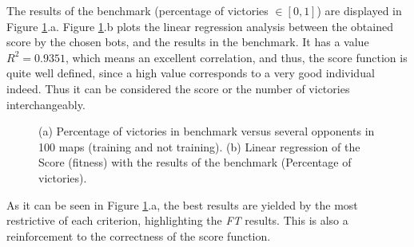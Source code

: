 \documentclass[runningheads,a4paper]{llncs}
\begin{document}
The results of the benchmark (percentage of victories $\in[0,1]$) are displayed in Figure \ref{fig:victories}.a. 
Figure \ref{fig:victories}.b plots the linear regression analysis between the obtained score by the chosen bots, and the results in the benchmark. It has a value $R^2=0.9351$, which means an excellent correlation, and thus, the score function is quite well defined, since a high value corresponds to a very good individual indeed. Thus it can be considered the score or the number of victories interchangeably.

\begin{figure}[h!tb]
\begin{center}
\end{center} 
\caption{(a) Percentage of victories in benchmark versus several opponents in 100 maps (training and not training). (b) Linear regression of the Score (fitness) with the results of the benchmark (Percentage of victories).} %
\label{fig:victories}
\end{figure}


As it can be seen in Figure \ref{fig:victories}.a, the best results are yielded by the most restrictive of each criterion, highlighting the \textit{FT} results. This is also a reinforcement to the correctness of the score function.
\end{document}
